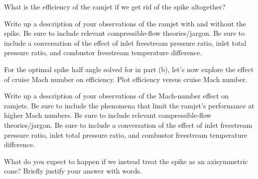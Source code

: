 \documentclass[../main.tex]{subfiles}
\begin{document}
\solution{}


What is the efficiency of the ramjet if we get rid of the spike altogether?

\givens{}

\assumptions{}

\solution{}


Write up a description of your observations of the ramjet with and without the spike.
Be sure to include relevant compressible-flow theories/jargon. 
Be sure to include a conversation of the effect of inlet freestream pressure ratio, inlet total pressure ratio, and combustor freestream temperature difference.

\givens{}

\assumptions{}

\solution{}


For the optimal spike half angle solved for in part (b), let's now explore the effect of cruise Mach number on efficiency. 
Plot efficiency versus cruise Mach number.

\givens{}

\assumptions{}

\solution{}


Write up a description of your observations of the Mach-number effect on ramjets. 
Be sure to include the phenomena that limit the ramjet's performance at higher Mach numbers.
Be sure to include relevant compressible-flow theories/jargon. 
Be sure to include a conversation of the effect of inlet freestream pressure ratio, inlet total pressure ratio, and combustor freestream temperature difference.

\givens{}

\assumptions{}

\solution{}


What do you expect to happen if we instead treat the spike as an axisymmetric cone?
Briefly justify your answer with words.

\givens{}

\assumptions{}

\solution{}
\end{document}
